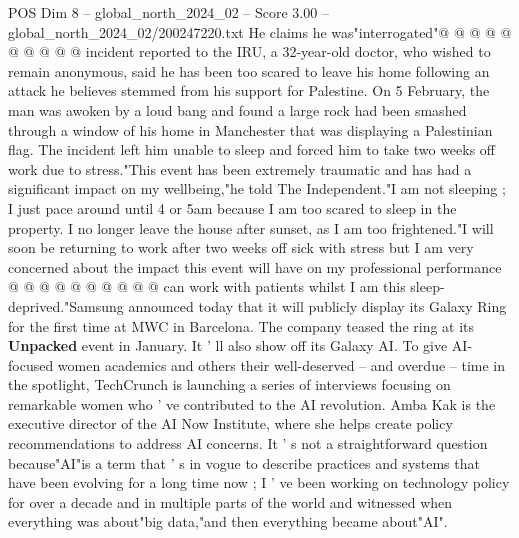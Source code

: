 \begin{textsample}{POS Dim 8 – global\_north\_2024\_02 – Score 3.00 – global\_north\_2024\_02/200247220.txt}
He claims he was"interrogated"@ @ @ @ @ @ @ @ @ @ incident reported to the IRU, a 32-year-old doctor, who wished to remain anonymous, said he has been too scared to leave his home following an attack he believes stemmed from his support for Palestine.
On 5 February, the man was awoken by a loud bang and found a large rock had been smashed through a window of his home in Manchester that was displaying a Palestinian flag.
The incident left him unable to sleep and forced him to take two weeks off work due to stress."This event has been extremely traumatic and has had a significant impact on my wellbeing,"he told The Independent."I am not sleeping ; I just pace around until 4 or 5am because I am too scared to sleep in the property.
I no longer leave the house after sunset, as I am too frightened."I will soon be returning to work after two weeks off sick with stress but I am very concerned about the impact this event will have on my professional performance @ @ @ @ @ @ @ @ @ @ can work with patients whilst I am this sleep-deprived."Samsung announced today that it will publicly display its Galaxy Ring for the first time at MWC in Barcelona.
The company teased the ring at its \textbf{Unpacked} event in January.
It ' ll also show off its Galaxy AI.
To give AI-focused women academics and others their well-deserved -- and overdue -- time in the spotlight, TechCrunch is launching a series of interviews focusing on remarkable women who ' ve contributed to the AI revolution.
Amba Kak is the executive director of the AI Now Institute, where she helps create policy recommendations to address AI concerns.
It ' s not a straightforward question because"AI"is a term that ' s in vogue to describe practices and systems that have been evolving for a long time now ; I ' ve been working on technology policy for over a decade and in multiple parts of the world and witnessed when everything was about"big data,"and then everything became about"AI".

\end{textsample}
